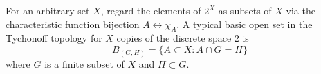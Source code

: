 For an arbitrary set $X$, regard the elements of $2^X$ as subsets of $X$ via the characteristic function bijection $A \leftrightarrow \chi_A$. A typical basic open set in the Tychonoff topology for $X$ copies of the discrete space $2$ is
$$
B_{(G, H)} = \{A \subset X : A \cap G = H\}
$$
where $G$ is a finite subset of $X$ and $H \subset G$.
